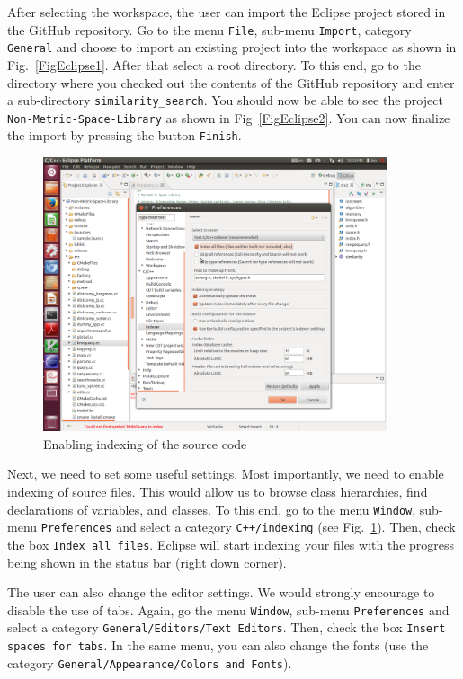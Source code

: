 \documentclass[runningheads,a4paper]{llncs}
\newcommand{\ttt}[1]{\texttt{#1}}
\begin{document}
{After selecting the workspace, the user can import the Eclipse project
stored in the GitHub repository.
Go to the menu \ttt{File}, sub-menu \ttt{Import}, category \ttt{General} 
and choose to import
an existing project into the workspace as shown in Fig.~\ref{FigEclipse1}.
After that select a root directory. To this end,
go to the directory where you checked out the contents 
of the GitHub repository and enter a sub-directory \ttt{similarity\_search}.
You should now be able to see the project \ttt{Non-Metric-Space-Library}
as shown in Fig~\ref{FigEclipse2}.
You can now finalize the import by pressing the button \ttt{Finish}.

\begin{figure}
\caption{\label{FigEclipse3}Enabling indexing of the source code}
\includegraphics[width=0.9\textwidth]{figures/Eclipse3.pdf}
\end{figure}

Next, we need to set some useful settings.
Most importantly, we need to enable indexing of source files.
This would allow us to browse class hierarchies, find declarations
of variables, and classes.
To this end, go to the menu \ttt{Window}, sub-menu \ttt{Preferences}
and select a category \ttt{C++/indexing} (see Fig.~\ref{FigEclipse3}).
Then, check the box \ttt{Index all files}.
Eclipse will start indexing your files 
with the progress being shown in the status bar (right down corner).

The user can also change the editor settings. 
We would strongly encourage to disable the use of tabs.
Again, go the menu \ttt{Window}, sub-menu \ttt{Preferences}
and select a category \ttt{General/Editors/Text Editors}.
Then, check the box \ttt{Insert spaces for tabs}.
In the same menu, you can also change the fonts (use the
category \ttt{General/Appearance/Colors and Fonts}).

}
\end{document}
